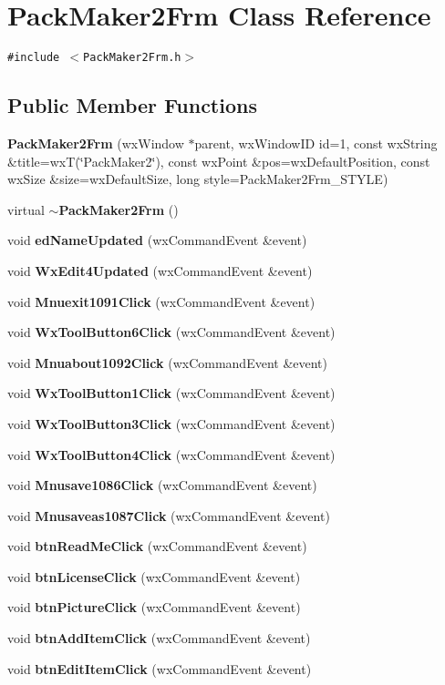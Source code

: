 \section{Pack\-Maker2Frm Class Reference}
\label{class_pack_maker2_frm}
{\tt \#include $<$Pack\-Maker2Frm.h$>$}

\subsection*{Public Member Functions}
\begin{CompactItemize}
\item 
{\bf Pack\-Maker2Frm} (wx\-Window $\ast$parent, wx\-Window\-ID id=1, const wx\-String \&title=wx\-T(\char`\"{}Pack\-Maker2\char`\"{}), const wx\-Point \&pos=wx\-Default\-Position, const wx\-Size \&size=wx\-Default\-Size, long style=Pack\-Maker2Frm\_\-STYLE)
\item 
virtual {\bf $\sim$Pack\-Maker2Frm} ()
\item 
void {\bf ed\-Name\-Updated} (wx\-Command\-Event \&event)
\item 
void {\bf Wx\-Edit4Updated} (wx\-Command\-Event \&event)
\item 
void {\bf Mnuexit1091Click} (wx\-Command\-Event \&event)
\item 
void {\bf Wx\-Tool\-Button6Click} (wx\-Command\-Event \&event)
\item 
void {\bf Mnuabout1092Click} (wx\-Command\-Event \&event)
\item 
void {\bf Wx\-Tool\-Button1Click} (wx\-Command\-Event \&event)
\item 
void {\bf Wx\-Tool\-Button3Click} (wx\-Command\-Event \&event)
\item 
void {\bf Wx\-Tool\-Button4Click} (wx\-Command\-Event \&event)
\item 
void {\bf Mnusave1086Click} (wx\-Command\-Event \&event)
\item 
void {\bf Mnusaveas1087Click} (wx\-Command\-Event \&event)
\item 
void {\bf btn\-Read\-Me\-Click} (wx\-Command\-Event \&event)
\item 
void {\bf btn\-License\-Click} (wx\-Command\-Event \&event)
\item 
void {\bf btn\-Picture\-Click} (wx\-Command\-Event \&event)
\item 
void {\bf btn\-Add\-Item\-Click} (wx\-Command\-Event \&event)
\item 
void {\bf btn\-Edit\-Item\-Click} (wx\-Command\-Event \&event)

\end{CompactItemize}

